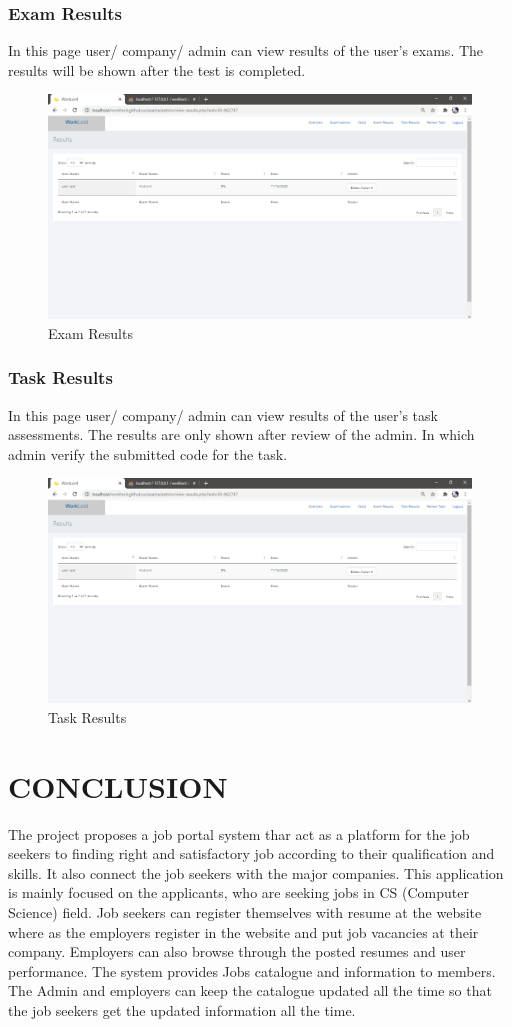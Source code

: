 \documentclass[a4paper,12pt]{report}
\begin{document}
\subsection {Exam Results}
In this page user/ company/ admin can view results of the user's exams. The results will be shown after the test is completed. 
\begin{figure}[bph]
	\centering
	\includegraphics[width=.7\linewidth ]{img/screenshots/exams_results_pre}
	\caption{Exam Results}
\end{figure}

\subsection {Task Results}
In this page user/ company/ admin can view results of the user's task assessments. The results are only shown after review of the admin. In which admin verify the submitted code for the task.
\begin{figure}[bph]
	\centering
	\includegraphics[width=.7\linewidth ]{img/screenshots/exams_results_pre}
	\caption{Task Results}
\end{figure}


\pagebreak

\chapter{CONCLUSION}

The project  proposes a job portal system thar act as a platform for the job seekers to  finding right and satisfactory job according to their qualification and skills. It also connect the job seekers with the major companies. This application is mainly focused on the applicants, who are seeking jobs in CS (Computer Science) field. Job seekers can register themselves with resume at the website where as the employers register in the website and put job vacancies at their company. Employers can also browse through the posted resumes and user performance. The system provides Jobs catalogue and information to members. The Admin and employers can keep the catalogue updated all the time so that the job seekers get the updated information all the time.\\
\end{document}
